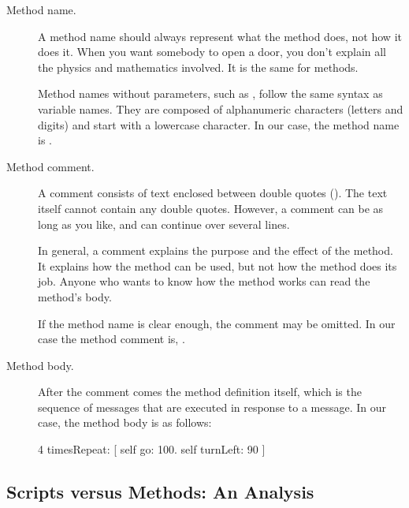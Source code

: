 \documentclass[a4paper,10pt,twoside]{book}
\begin{document}
\begin{description}
	\item[Method name.] A method name should always represent what the method does, not how 
it does it. When you want somebody to open a door, you don’t explain all the physics and 
mathematics involved. It is the same for methods. 


	Method names without parameters, such as , follow the same syntax as variable 
names. They are composed of alphanumeric characters (letters and digits) and start with 
a lowercase character. In our case, the method name is .

	\item[Method comment.] A comment consists of text enclosed between double quotes (). The text itself cannot contain any double quotes. However, a comment 
can be as long as you like, and can continue over several lines. 

In general, a comment explains the purpose and the effect of the method. It explains how 
the method can be used, but not how the method does its job. Anyone who wants to know 
how the method works can read the method’s body. 

If the method name is clear enough, the comment may be omitted. In our case the 
method comment is, . 

	\item[Method body.] After the comment comes the method definition itself, which is the 
sequence of messages that are executed in response to a message. In our case, the 
method body is as follows: 

\begin{method}[]{}
4 timesRepeat: 
	[ self go: 100. 
	self turnLeft: 90 ]
\end{method}

\end{description}


\subsection{Scripts versus Methods: An Analysis}
\end{document}
